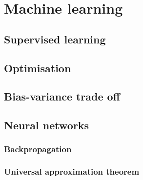 \chapter{Machine learning}
\label{chap:ml}

\section{Supervised learning}

\section{Optimisation}
\section{Bias-variance trade off}
\section{Neural networks}

\subsection{Backpropagation}
\subsection{Universal approximation theorem}